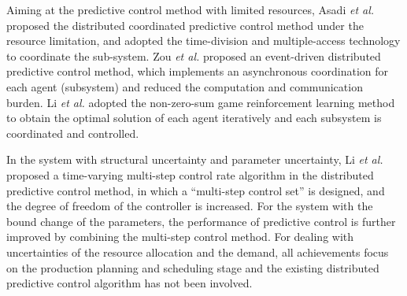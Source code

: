 \documentclass[conference]{IEEEtran}
\begin{document}
Aiming at the predictive control method with limited resources, Asadi \emph{et al.} \cite{asadi} proposed the distributed coordinated predictive control method under the resource limitation, and adopted the time-division and multiple-access technology to coordinate the sub-system. Zou \emph{et al.} \cite{zouyy} proposed an event-driven distributed predictive control method, which implements an asynchronous coordination for each agent (subsystem) and reduced the computation and communication burden. Li \emph{et al.} \cite{lijn} adopted the non-zero-sum game reinforcement learning method to obtain the optimal solution of each agent iteratively and each subsystem is coordinated and controlled.

In the system with structural uncertainty and parameter uncertainty, Li \emph{et al.} \cite{lidewei} proposed a time-varying multi-step control rate algorithm in the distributed predictive control method, in which a ``multi-step control set'' is designed, and the degree of freedom of the controller is increased. For the system with the bound change of the parameters, the performance of predictive control is further improved by combining the multi-step control method. For dealing with uncertainties of the resource allocation and the demand, all achievements focus on the production planning and scheduling stage and the existing distributed predictive control algorithm has not been involved.


\end{document}
